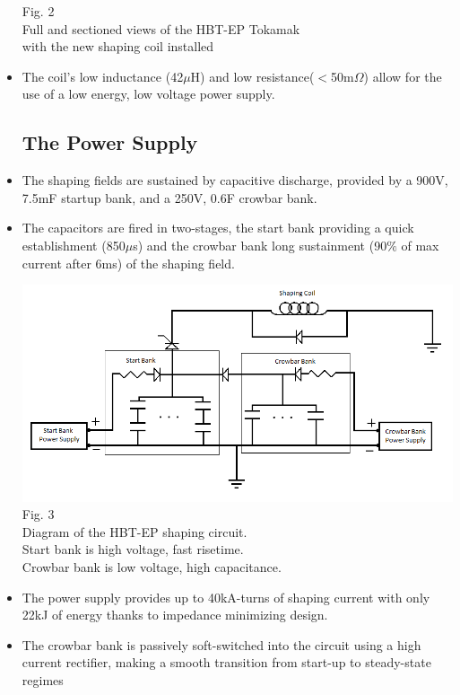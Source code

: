 \documentclass{article}
\begin{document}
\begin{multicols}{5}
\begin{itemize}
\begin{center}
Fig. 2\\
Full and sectioned views of the HBT-EP Tokamak\\
with the new shaping coil installed\\
\end{center}
\item The coil's low inductance (42$\mu$H) and low resistance($<$50m$\Omega$) allow for the use of a low energy, low voltage power supply.
\subsection{The Power Supply}
\item The shaping fields are sustained by capacitive discharge, provided by a 900V, 7.5mF startup bank, and a 250V, 0.6F crowbar bank.  
\item The capacitors are fired in two-stages, the start bank providing a quick establishment (850$\mu$s) and the crowbar bank long sustainment (90$\%$ of max current after 6ms) of the shaping field.\\
\vspace{.25in}
\begin{center}
\includegraphics[width=0.8\columnwidth]{Simplified_bank_diagram.png}
\newline
Fig. 3\\
Diagram of the HBT-EP shaping circuit.\\
Start bank is high voltage, fast risetime.\\
Crowbar bank is low voltage, high capacitance.\\
\end{center}
\columnbreak
\item The power supply provides up to 40kA-turns of shaping current with only 22kJ of energy thanks to impedance minimizing design.
\item The crowbar bank is passively soft-switched into the circuit using a high current rectifier, making a smooth transition from start-up to steady-state regimes\\

\end{itemize}
\end{multicols}
\end{document}
